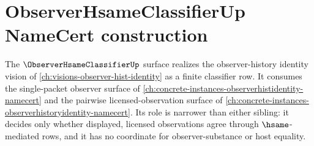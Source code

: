 \chapter{ObserverHsameClassifierUp NameCert construction}
\label{ch:concrete-instances-observerhsameclassifier-namecert}

The $\ObserverHsameClassifierUp$ surface realizes the observer-history identity vision of \autoref{ch:visions-observer-hist-identity} as a finite classifier row. It consumes the single-packet observer surface of \autoref{ch:concrete-instances-observerhistidentity-namecert} and the pairwise licensed-observation surface of \autoref{ch:concrete-instances-observerhistoryidentity-namecert}. Its role is narrower than either sibling: it decides only whether displayed, licensed observations agree through $\hsame$-mediated rows, and it has no coordinate for observer-substance or host equality.



